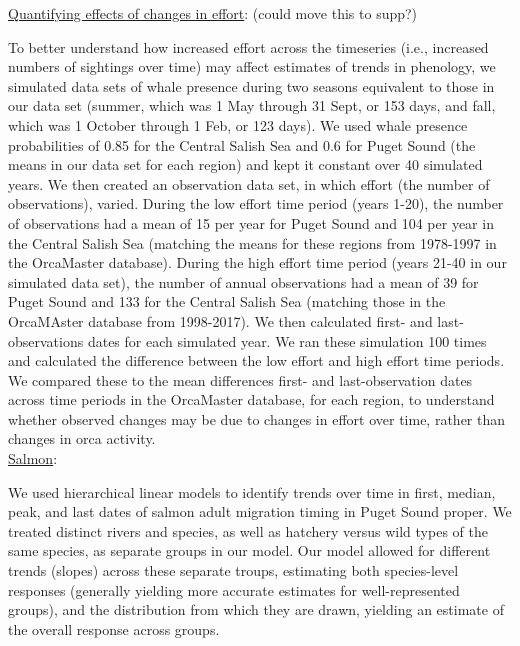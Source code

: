 \documentclass{article}
\begin{document}
\underline{Quantifying effects of changes in effort}: (could move this to supp?)
\par To better understand how increased effort across the timeseries (i.e., increased numbers of sightings over time) may affect estimates of trends in phenology, we simulated data sets of whale presence during two seasons equivalent to those in our data set (summer, which was 1 May through 31 Sept, or 153 days, and fall, which was 1 October through 1 Feb, or 123 days). We used whale presence probabilities of 0.85 for the Central Salish Sea and 0.6 for Puget Sound (the means in our data set for each region) and kept it constant over 40 simulated years. We then created an observation data set, in which effort (the number of observations), varied. During the low effort time period (years 1-20), the number of observations had a mean of 15 per year for Puget Sound and 104 per year in the Central Salish Sea (matching the means for these regions from 1978-1997 in the OrcaMaster database).  During the high effort time period (years 21-40 in our simulated data set), the number of annual observations had a mean of 39 for Puget Sound and 133 for the Central Salish Sea (matching those in the OrcaMAster database from 1998-2017). We then calculated first- and last- observations dates for each simulated year. We ran these simulation 100 times and calculated the difference between the low effort and high effort time periods. We compared these to the mean differences first- and last-observation dates across time periods in the OrcaMaster database, for each region, to understand whether observed changes may be due to changes in effort over time, rather than changes in orca activity.\\
\underline{Salmon}:
\par We used hierarchical linear models to identify trends over time in first, median, peak, and last dates of salmon adult migration timing in Puget Sound proper. We treated distinct rivers and species, as well as hatchery versus wild types of the same species, as separate groups in our model. Our model allowed for different trends (slopes) across these separate troups, estimating both species-level responses (generally yielding more accurate estimates for well-represented groups), and the distribution from which they are drawn, yielding an estimate of the overall response across groups.
\end{document}
